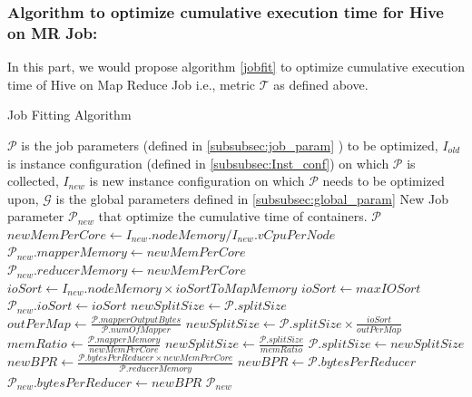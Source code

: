 \noindent\subsubsection*{\bf Algorithm to optimize cumulative execution time for Hive on MR Job:}
In this part, we would propose algorithm \ref{jobfit} to optimize cumulative execution time of Hive on Map Reduce Job  i.e., metric $\mathcal{T}$ as defined above.
\renewcommand{\algorithmicrequire}{\textbf{Input:}}
\renewcommand{\algorithmicensure}{\textbf{Output:}}
\renewcommand{\algorithmiccomment}[1]{// #1}
\begin{algorithm}
\caption{Job Fitting Algorithm}\label{jobfit}
\begin{algorithmic}[1]
\footnotesize
\REQUIRE  $\mathcal{P}$ is the job parameters (defined in \ref{subsubsec:job_param} ) to be optimized, $I_{old}$  is instance configuration (defined in \ref{subsubsec:Inst_conf}) on which $\mathcal{P}$ is collected, $I_{new}$ is new instance configuration on which $\mathcal{P}$ needs to be optimized upon, $\mathcal{G}$ is the global parameters defined in \ref{subsubsec:global_param}
\ENSURE New Job parameter $\mathcal{P}_{new}$ that optimize the cumulative time of containers.
 \RETURN $\mathcal{P}$
\ENDIF
\STATE $newMemPerCore \gets I_{new}.nodeMemory / I_{new}.vCpuPerNode$
\STATE $\mathcal{P}_{new}.mapperMemory \gets newMemPerCore$
\STATE $\mathcal{P}_{new}.reducerMemory \gets newMemPerCore$
\STATE $ioSort \gets I_{new}.nodeMemory \times \textit{ioSortToMapMemory}$
\STATE $ioSort \gets maxIOSort$
\ENDIF
\STATE $\mathcal{P}_{new}.ioSort \gets ioSort$
\STATE $newSplitSize \gets \mathcal{P}.splitSize$
\STATE $outPerMap \gets \frac{\mathcal{P}.mapperOutputBytes}{\mathcal{P}.numOfMapper}$
\STATE $newSplitSize \gets \mathcal{P}.splitSize \times \frac{ioSort}{outPerMap}$
\STATE $memRatio \gets \frac{\mathcal{P}.mapperMemory}{newMemPerCore}$
\STATE $newSplitSize \gets \frac{\mathcal{P}.splitSize}{memRatio} $
\ENDIF
\STATE $\mathcal{P}.splitSize \gets newSplitSize$
\STATE $newBPR \gets \frac{\mathcal{P}.bytesPerReducer \times newMemPerCore}{\mathcal{P}.reducerMemory}$
\ELSE
\STATE $newBPR \gets \mathcal{P}.bytesPerReducer$
\ENDIF
\STATE $\mathcal{P}_{new}.bytesPerReducer \gets newBPR$
\STATE \RETURN $\mathcal{P}_{new}$
\end{algorithmic}
\end{algorithm}




